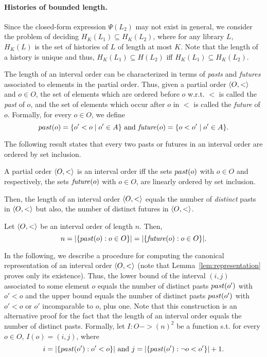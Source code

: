 \paragraph{Histories of bounded length.}
Since the closed-form expression $\Psi(L_2)$ may not exist in general, we consider the problem of deciding
$H_K(L_1) \subseteq H_K(L_2)$, where for any library $L$, $H_K(L)$ is the set of histories of $L$ of length at most $K$.
Note that the length of a history is unique and thus, $H_K(L_1) \subseteq H(L_2)$ iff $H_K(L_1) \subseteq H_K(L_2)$.

The length of an interval order can be characterized 
in terms of \emph{pasts} and \emph{futures} associated to elements in the partial order.
Thus, given a partial order $\left\langle {O,<} \right\rangle$ and $o\in O$, the set of elements which
are ordered before $o$ w.r.t. $<$ is called the \emph{past} of $o$, and the set
of elements which occur after $o$ in $<$ is called the \emph{future} of $o$.
Formally, for every $o\in O$, we define
\[
past({o})=\{o' < o\mid o'\in A\}\mbox{ and }\mathit{future}({o})=\{o < o'\mid o'\in A\}.
\]


The following result states that every two pasts or futures in an interval
order are ordered by set inclusion.

\begin{lemma}

  A partial order $\left\langle {O,<} \right\rangle$ is an interval order iff the sets $past({o})$ with $o\in O$ and respectively,  the sets $\mathit{future}({o})$
  with $o\in O$, are
  linearly ordered by set inclusion. 

\end{lemma}

Then, the length of an interval order $\left\langle {O,<} \right\rangle$ equals the number of \emph{distinct} pasts in $\left\langle {O,<} \right\rangle$ but also,
the number of distinct futures in $\left\langle {O,<} \right\rangle$.

\begin{lemma}\label{lemma:len}
Let $\left\langle {O,<} \right\rangle$ be an interval order of length $n$. Then,
\[
n=|{\{ past({o}):o\in O \}}| = |{\{ \mathit{future}({o}):o\in O \}}|.
\]
\end{lemma}

In the following, we describe a procedure for computing the canonical representation of an interval order $\left\langle {O,<} \right\rangle$ 
(note that Lemma~\ref{lem:representation} proves only its existence).
Thus, the lower bound of the interval $(i,j)$ associated to some element $o$ equals the number of distinct pasts $past({o'})$ with $o'<o$
and the upper bound equals the number of distinct pasts $past({o'})$ with $o'<o$ or $o'$ incomparable to $o$, plus one.
Note that this construction is an alternative proof for the fact that the length of an interval order equals the number of distinct pasts.
Formally, let $I : O -> (n)^2$ be a function s.t. for every $o\in O$, $I(o)=(i,j)$, where 
\[
i= |{\{ past({o'}):o'<o \}}|\mbox{ and }j= |{\{ past({o'}):\neg o<o' \}}|+1.
\] 

